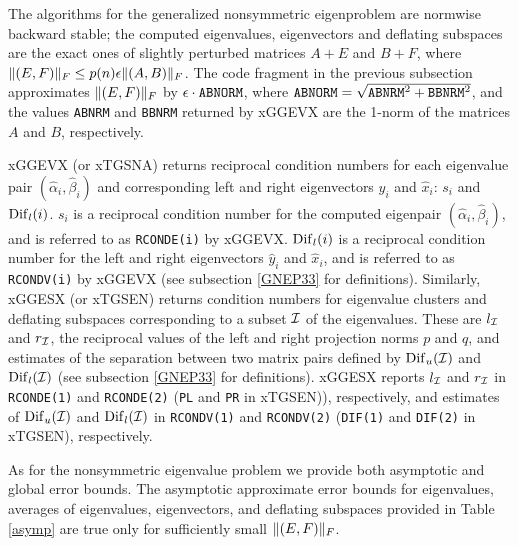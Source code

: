 The algorithms for the generalized nonsymmetric eigenproblem are normwise
backward stable; the computed eigenvalues, eigenvectors and deflating
subspaces are the exact ones of slightly perturbed matrices $A + E$ and $B +F$,
where $\|(E, F)\|_F \leq p(n) \epsilon \|(A, B)\|_F$.
The code fragment in the previous subsection approximates
$\|(E, F)\|_F$ by $\epsilon \cdot {\tt ABNORM}$, where
${\tt ABNORM} = \sqrt{ {\tt ABNRM}^2 + {\tt BBNRM}^2 }$,
and the values {\tt ABNRM} and {\tt BBNRM} returned by xGGEVX
are the 1-norm of the matrices $A$ and $B$, respectively.

xGGEVX (or xTGSNA) returns reciprocal condition numbers
for each eigenvalue pair
$({\hat{\alpha}}_i, {\hat{\beta}}_i)$ and corresponding
left and right eigenvectors $\hat{y}_i$ and $\hat{x}_i$:
$s_i$ and ${\rm Dif}_l(i)$. $s_i$ is a reciprocal condition
number for the computed eigenpair $({\hat{\alpha}}_i, {\hat{\beta}}_i)$,
and is referred to as {\tt RCONDE(i)} by xGGEVX.
${\rm Dif}_l(i)$ is a reciprocal condition number for the left and right
eigenvectors $\hat{y}_i$ and $\hat{x}_i$, and is referred to as
{\tt RCONDV(i)} by xGGEVX (see subsection \ref{GNEP33} for definitions).
Similarly, xGGESX (or xTGSEN) returns condition numbers for
eigenvalue clusters and deflating subspaces corresponding to
a subset $\cal I$ of the eigenvalues.
These are $l_{\cal I}$ and $r_{\cal I}$, the reciprocal values of
the left and right projection norms $p$ and $q$, and
estimates of the separation between two matrix pairs
defined by ${\rm Dif}_u({\cal I})$ and ${\rm Dif}_l({\cal I})$
(see subsection \ref{GNEP33} for definitions).
xGGESX reports $l_{\cal I}$ and $r_{\cal I}$ in {\tt RCONDE(1)}
and {\tt RCONDE(2)} ({\tt PL} and {\tt PR} in xTGSEN)), respectively,
and estimates of ${\rm Dif}_u({\cal I})$ and ${\rm Dif}_l({\cal I})$
in {\tt RCONDV(1)}
and {\tt RCONDV(2)} ({\tt DIF(1)} and {\tt DIF(2)} in xTGSEN), respectively.

As for the nonsymmetric eigenvalue problem we provide both asymptotic
and global error bounds.  The asymptotic approximate error bounds for
eigenvalues, averages of eigenvalues, eigenvectors, and deflating
subspaces provided in Table \ref{asymp} are true only for
sufficiently small $\|(E,F)\|_F$.

